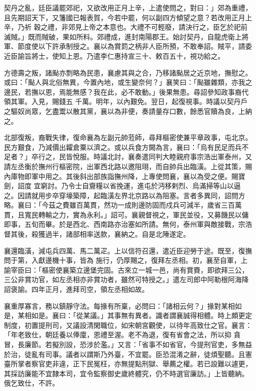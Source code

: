 \begin{pinyinscope}
 契丹之亂，廷臣議罷郊祀，又欲改用正月上辛，上遣使問之，對曰：」郊為重禮，且先期詔天下，又籓國已報表賀，今若中罷，何以副四方傾望之意？若改用正月上辛，乃祈
 穀之禮，非郊見上帝之本意也。大禮不可輕廢，請決行之，臣乞於祀前滅賊。」既而賊破，果如所料。郊禮成，進封南陽郡王。始討契丹，自龍虎衛上將軍、節度使以下許承制授之。襄以為賞罰之柄非人臣所預，不敢奉詔。賊平，請委近臣諭旨將士，使知上恩。乃遣李仁惠持宣三十、敕百五十，視功給之。



 方德壽之叛，諸颭亦剽略為民患，襄慮其與之合，乃移諸颭居之近京地，撫慰之。或曰：「颭人與北俗無異，今置內地，或生變奈何？」襄笑曰：「颭雖雜類，亦我之邊民，若撫以恩，焉能無感？我在此，必不敢動。」後果無患。尋詔參知政事裔代領其軍。入見，賜錢五
 千萬。明年，以內艱免。翌日，起復視事。時議以契丹戶之驅奴尚眾，乞盡鬻以散其黨，襄以為非便，奏請量存口數，餘悉官贖為良，上納之。



 北部復叛，裔戰失律，復命襄為左副元帥蒞師，尋拜樞密使兼平章政事，屯北京。民方艱食，乃減價出糶倉粟以濟之。或以兵食方闕為言，襄曰：「烏有民足而兵不足者？」卒行之，民皆悅服。時議北討，襄奏遣同判大睦親府事宗浩出軍泰州，又請左丞衡於撫州行樞密院，出軍西北路以邀阻珝，而自帥兵出臨潢。上從其策，賜內庫物即軍中用之。其後斜出部族詣撫州降，上專使問襄，襄以為受之便。賜寶劍，詔度
 宜窮討。乃令士自齎糧以省挽運，進屯於沔移剌烈、烏滿掃等山以逼之。因請就用步卒穿壕築障，起臨潢左界北京路以為阻塞。言者多異同，詔問方略。襄曰：「今茲之費雖百萬貫，然功一成則邊防固而戍兵可減半，歲省三百萬貫，且寬民轉輸之力，實為永利。」詔可。襄親督視之，軍民並役，又募饑民以傭即事，五旬而畢。於是西北、西南路亦治塞如所請。無何，泰州軍與敵接戰，宗浩督其後，殺獲過半，諸部相率送款，襄納之。自是北陲遂定。



 襄還臨潢，減屯兵四萬、馬二萬疋。上以信符召還，遣近臣迎勞于途。既至，復撫問于第，入獻邊機十事，皆為
 施行，仍厚賜之，復拜左丞相。初，襄至自軍，上諭宰臣曰：「樞密使襄築立邊堡完固。古來立一城一邑，尚有賞賚，即欲拜三公，三公非賞功官，如左丞相亦非賞功者，雖然可特授之。」遣左司郎中阿勒根阿海降詔褒諭。四年正月，進拜司空，領左丞相如故。



 襄重厚寡言，務以鎮靜守法。每掾有所稟，必問曰：「諸相云何？」掾對某相如是，某相如是。襄曰：「從某議。」其事無有異者。識者謂襄誠得相體。時上頗更定制度，初置提刑司，又議設清閑職位，如宋朝宮觀使，以待年高致仕之官。襄言：「年老致仕，朝廷養以俸廩，恩禮至渥。老不為退，復有省會之法，所以抑
 貪冒，長廉節。若擬別設，恐涉於濫。」又言：「省事不如省官，今提刑官吏，多無益於治，徒亂有司事。議者以謂斯乃外臺，不宜罷。臣恐混淆之辭，徒煩聖聽。且憲臺所掌者察官吏非違，正下民冤枉，亦無提點刑獄、舉薦之權。若已設難以遽更，其採訪廉能不宜隸本司，宜令監察御史歲終體究，仍不時選官廉訪。」上皆聽納。俄乞致仕，不許。




\end{pinyinscope}
